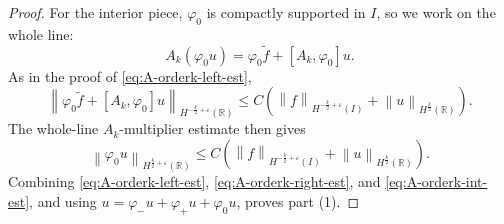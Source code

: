 \documentclass[11pt,reqno]{amsart}
\theoremstyle{plain}
\theoremstyle{definition}
\numberwithin{equation}{section}
\newcommand{\paren}[1]{\left(#1\right)}
\newcommand{\wt}[1]{\widetilde{#1}}
\newcommand{\norm}[1]{\left\lVert #1 \right\rVert}
\newcommand{\vph}{\varphi}
\newcommand{\R}{\mathbb{R}}
\begin{document}
\begin{proof}
For the interior piece, $\vph_0$ is compactly supported in $I$, so we work
on the whole line:
\begin{equation}\label{eq:A-orderk-int-local}
    A_k(\vph_0u)=\vph_0\wt f + [A_k,\vph_0]u .
\end{equation}
As in the proof of \eqref{eq:A-orderk-left-est},
\begin{equation}
    \norm{\vph_0\wt f + [A_k,\vph_0]u}_{H^{-\frac{k}{2}+\varepsilon}(\R)}
    \le C\paren{
    \norm{f}_{H^{-\frac{k}{2}+\varepsilon}(I)}
    + \norm{u}_{H^{\frac{k}{2}}(\R)}} .
\end{equation}
The whole-line $A_k$-multiplier estimate then gives
\begin{equation}\label{eq:A-orderk-int-est}
    \norm{\vph_0u}_{H^{\frac{k}{2}+\varepsilon}(\R)}
    \le C\paren{
    \norm{f}_{H^{-\frac{k}{2}+\varepsilon}(I)}
    + \norm{u}_{H^{\frac{k}{2}}(\R)}} .
\end{equation}
Combining \eqref{eq:A-orderk-left-est}, \eqref{eq:A-orderk-right-est}, and
\eqref{eq:A-orderk-int-est}, and using
$u=\vph_-u+\vph_+u+\vph_0u$, proves part (1).


\end{proof}
\end{document}
